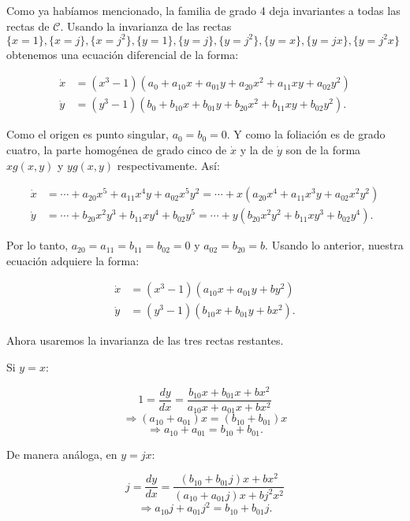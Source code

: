 \label{sec:FamiliaDeGradoCuatro}
Como ya habíamos mencionado, la familia de grado 4 deja invariantes a todas las rectas de $\mathcal{C}$. Usando la invarianza de las rectas  $\{x=1\}, \{x=j\}, \{x=j^{2}\}, \{y=1\}, \{y=j\}, \{y=j^{2}\}, \{y=x\}, \{y=jx\}, \{y=j^{2}x\}$ obtenemos una ecuación diferencial de la forma:



\begin{align*}
\dot{x} & =(x^{3}-1)(a_{0} + a_{10}x + a_{01}y + a_{20}x^{2} + a_{11}xy + a_{02}y^{2}) \\
\dot{y} & =(y^{3}-1)(b_{0} + b_{10}x + b_{01}y + b_{20}x^{2} + b_{11}xy + b_{02}y^{2}).
\end{align*}



Como el origen es punto singular, $a_{0}=b_{0}=0$. Y como la foliación es de grado cuatro, la parte homogénea de grado cinco de $\dot{x}$ y la de $\dot{y}$ son de la forma $xg(x,y)$ y $yg(x,y)$ respectivamente. Así:


\begin{align*}
\dot{x}& =\cdots+a_{20}x^{5} + a_{11}x^{4}y + a_{02}x^{5}y^{2} =\cdots+x(a_{20}x^{4} + a_{11}x^{3}y + a_{02}x^{2}y^{2}) \\
\dot{y}& =\cdots+b_{20}x^{2}y^{3} + b_{11}xy^{4} + b_{02}y^{5} =\cdots+y(b_{20}x^{2}y^{2} + b_{11}xy^{3} + b_{02}y^{4}) .
\end{align*}

Por lo tanto, $a_{20}=a_{11}=b_{11}=b_{02}=0$ y $a_{02}=b_{20}=b$. Usando lo anterior, nuestra ecuación adquiere la forma:


\begin{align*} 
\dot{x}&=(x^{3}-1)(a_{10}x + a_{01}y + by^{2}) \\
\dot{y}&=(y^{3}-1)(b_{10}x + b_{01}y + bx^{2}).
\end{align*}

Ahora usaremos la invarianza de las tres rectas restantes.

Si $y=x$:

$$ 1 = \frac{dy}{dx} = \frac{b_{10}x + b_{01}x + bx^{2}}{a_{10}x + a_{01}x + bx^{2}}$$
$$\Rightarrow (a_{10} + a_{01})x = (b_{10} + b_{01})x$$
\begin{equation}
\label{temp1}
\Rightarrow a_{10}+a_{01}=b_{10}+b_{01}.
\end{equation}

De manera análoga, en $y=jx$:

$$j = \frac{dy}{dx} = \frac{(b_{10}+b_{01}j)x + bx^{2}}{(a_{10}+a_{01}j)x + bj^{2}x^{2}}$$
\begin{equation}
\label{temp2}
\Rightarrow a_{10}j + a_{01}j^{2} = b_{10} + b_{01}j.
\end{equation}

